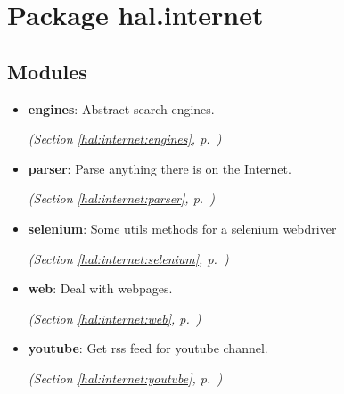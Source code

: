 %
%
%


\section{Package hal.internet}

    \label{hal:internet}


\subsection{Modules}

\begin{itemize}
\setlength{\parskip}{0ex}
\item \textbf{engines}: Abstract search engines.



  \textit{(Section \ref{hal:internet:engines}, p.~\pageref{hal:internet:engines})}

\item \textbf{parser}: Parse anything there is on the Internet.



  \textit{(Section \ref{hal:internet:parser}, p.~\pageref{hal:internet:parser})}

\item \textbf{selenium}: Some utils methods for a selenium webdriver



  \textit{(Section \ref{hal:internet:selenium}, p.~\pageref{hal:internet:selenium})}

\item \textbf{web}: Deal with webpages.



  \textit{(Section \ref{hal:internet:web}, p.~\pageref{hal:internet:web})}

\item \textbf{youtube}: Get rss feed for youtube channel.



  \textit{(Section \ref{hal:internet:youtube}, p.~\pageref{hal:internet:youtube})}

\end{itemize}


